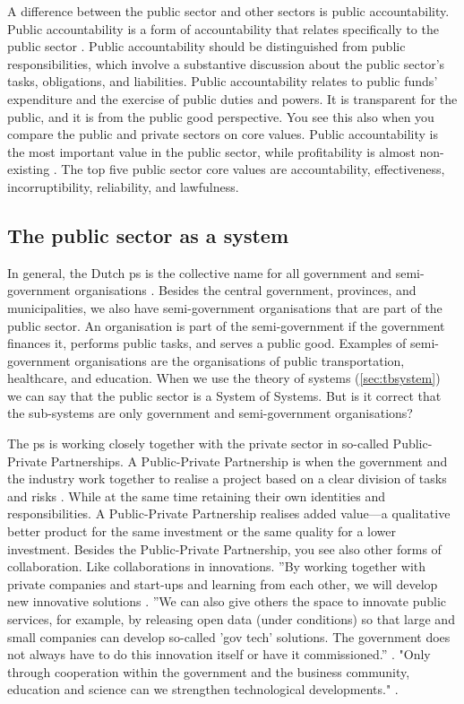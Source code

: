A difference between the public sector and other sectors is public accountability. Public accountability is a form of accountability that relates specifically to the public sector \parencite{Boers2009}. Public accountability should be distinguished from public responsibilities, which involve a substantive discussion about the public sector's tasks, obligations, and liabilities. Public accountability relates to public funds' expenditure and the exercise of public duties and powers. It is transparent for the public, and it is from the public good perspective. You see this also when you compare the public and private sectors on core values. Public accountability is the most important value in the public sector, while profitability is almost non-existing \parencite[p.~472]{Wal2008}. The top five public sector core values are accountability, effectiveness, incorruptibility, reliability, and lawfulness.

\subsection{The public sector as a system}
\label{sub:tbpssystemofsystems}
In general, the Dutch \gls{ps} is the collective name for all government and semi-government organisations \parencite[p.~261]{Pathirane1982}. Besides the central government, provinces, and municipalities, we also have semi-government organisations that are part of the public sector. An organisation is part of the semi-government if the government finances it, performs public tasks, and serves a public good. Examples of semi-government organisations are the organisations of public transportation, healthcare, and education. When we use the theory of systems (\cref{sec:tbsystem}) we can say that the public sector is a System of Systems. But is it correct that the sub-systems are only government and semi-government organisations?

The \gls{ps} is working closely together with the private sector in so-called Public-Private Partnerships. A Public-Private Partnership is when the government and the industry work together to realise a project based on a clear division of tasks and risks \parencite[p.~8]{Enneman2007}. While at the same time retaining their own identities and responsibilities. A Public-Private Partnership realises added value---a qualitative better product for the same investment or the same quality for a lower investment. Besides the Public-Private Partnership, you see also other forms of collaboration. Like collaborations in innovations. ''By working together with private companies and start-ups and learning from each other, we will develop new innovative solutions \parencite[p.~120]{Digitaleoverheid2021}. ''We can also give others the space to innovate public services, for example, by releasing open data (under conditions) so that large and small companies can develop so-called 'gov tech' solutions. The government does not always have to do this innovation itself or have it commissioned.'' \parencite[p.~120]{Digitaleoverheid2021}. "Only through cooperation within the government and the business community, education and science can we strengthen technological developments." \parencite[p.~68]{Digitaleoverheid2021}.

